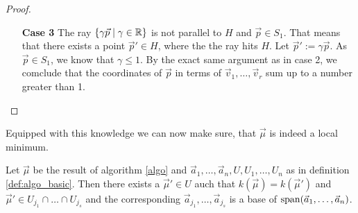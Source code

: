 \begin{proof}
\begin{itemize}
        \item[\textbf{Case 3}] The ray $\{\gamma\vec p\mid \gamma \in \mathbb{R}\}$ is not parallel to $H$ and $\vec p \in S_1$. That means that there exists a point $\vec p' \in H$, where the the ray hits $H$. Let $\vec p' := \gamma \vec p$. As $\vec p \in S_1$, we know that $\gamma \leq 1$. By the exact same argument as in case 2, we comclude that the coordinates of $\vec p$ in terms of $\vec v_1, \dots, \vec v_r$ sum up to a number greater than 1. \qedhere
    \end{itemize}
\end{proof}

Equipped with this knowledge we can now make sure, that $\vec\mu$ is indeed a local minimum.
\begin{lemma}
    \label{lemma:sub_fecets_are_extendable}
    Let $\vec\mu$ be the result of algorithm \ref{algo} and $\vec a_1, \dots, \vec a_n, U, U_1, \dots, U_n$ as in definition \ref{def:algo_basic}. Then there exists a $\vec\mu' \in U$ auch that $k(\vec\mu) = k(\vec\mu')$ and $\vec\mu' \in U_{j_1} \cap \dots \cap U_{j_{s}}$ and the corresponding $\vec a_{j_1}, \dots, \vec a_{j_s}$ is a base of $\operatorname{span}(\vec a_1, \dots, \vec a_n)$.
\end{lemma}

